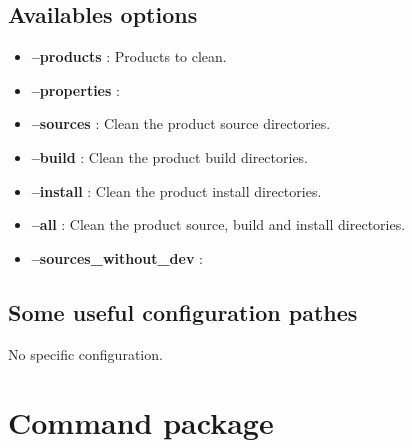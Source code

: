 \documentclass[a4paper,10pt,english]{sphinxmanual}
\begin{document}
\subsection{Availables options}
\label{commands/clean:availables-options}\begin{itemize}
\item {} 
\textbf{--products} : Products to clean.

\item {} 
\textbf{--properties} :


\item {} 
\textbf{--sources} : Clean the product source directories.

\item {} 
\textbf{--build} : Clean the product build directories.

\item {} 
\textbf{--install} : Clean the product install directories.

\item {} 
\textbf{--all} : Clean the product source, build and install directories.

\item {} 
\textbf{--sources\_without\_dev} :


\end{itemize}


\subsection{Some useful configuration pathes}
\label{commands/clean:some-useful-configuration-pathes}
No specific configuration.


\section{Command package}
\label{commands/package:svn}\label{commands/package:command-package}\label{commands/package::doc}
\end{document}
